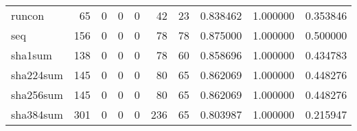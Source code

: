 \begin{longtable}{lrrrrrrrrr}
runcon    &                                    65 &                                                  0 &                                                  0 &                                                  0 &                                                 42 &                                                 23 &                                           0.838462 &                               1.000000 &                             0.353846 \\
seq       &                                   156 &                                                  0 &                                                  0 &                                                  0 &                                                 78 &                                                 78 &                                           0.875000 &                               1.000000 &                             0.500000 \\
sha1sum   &                                   138 &                                                  0 &                                                  0 &                                                  0 &                                                 78 &                                                 60 &                                           0.858696 &                               1.000000 &                             0.434783 \\
sha224sum &                                   145 &                                                  0 &                                                  0 &                                                  0 &                                                 80 &                                                 65 &                                           0.862069 &                               1.000000 &                             0.448276 \\
sha256sum &                                   145 &                                                  0 &                                                  0 &                                                  0 &                                                 80 &                                                 65 &                                           0.862069 &                               1.000000 &                             0.448276 \\
sha384sum &                                   301 &                                                  0 &                                                  0 &                                                  0 &                                                236 &                                                 65 &                                           0.803987 &                               1.000000 &                             0.215947 \\

\end{longtable}
